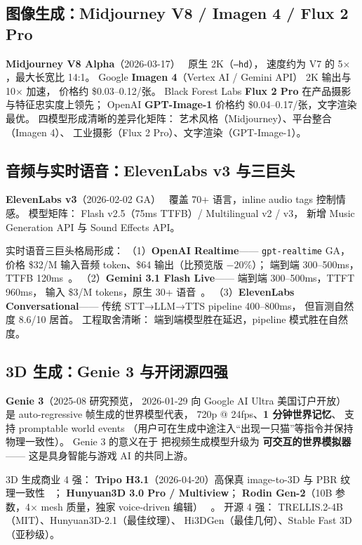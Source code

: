 \subsection{图像生成：Midjourney V8 / Imagen 4 / Flux 2 Pro}

\textbf{Midjourney V8 Alpha}（2026-03-17）~\cite{midjourney_v8_2026}
原生 2K（\texttt{--hd}），
速度约为 V7 的 5$\times$，最大长宽比 14:1。
Google \textbf{Imagen 4}（Vertex AI / Gemini API）
2K 输出与 10$\times$ 加速，
价格约 \$0.03--0.12/张。
Black Forest Labs \textbf{Flux 2 Pro} 在产品摄影与特征忠实度上领先；
OpenAI \textbf{GPT-Image-1} 价格约 \$0.04--0.17/张，文字渲染最优。
四模型形成清晰的差异化矩阵：
艺术风格（Midjourney）、平台整合（Imagen 4）、
工业摄影（Flux 2 Pro）、文字渲染（GPT-Image-1）。

\subsection{音频与实时语音：ElevenLabs v3 与三巨头}

\textbf{ElevenLabs v3}（2026-02-02 GA）~\cite{elevenlabs_v3_2026}
覆盖 70+ 语言，inline audio tags 控制情感。
模型矩阵：
Flash v2.5（75ms TTFB）/ Multilingual v2 / v3，
新增 Music Generation API 与 Sound Effects API。

实时语音三巨头格局形成：
（1）\textbf{OpenAI Realtime}——
\texttt{gpt-realtime} GA，
价格 \$32/M 输入音频 token、\$64 输出（比预览版 $-20\%$）；
端到端 300--500ms，TTFB 120ms~\cite{gpt_realtime_ga_2026}。
（2）\textbf{Gemini 3.1 Flash Live}——
端到端 300--500ms，TTFT 960ms，
输入 \$3/M tokens，原生 30+ 语音~\cite{gemini31_flash_live_2026}。
（3）\textbf{ElevenLabs Conversational}——
传统 STT→LLM→TTS pipeline 400--800ms，
但盲测自然度 8.6/10 居首。
工程取舍清晰：
端到端模型胜在延迟，pipeline 模式胜在自然度。

\subsection{3D 生成：Genie 3 与开闭源四强}

\textbf{Genie 3}（2025-08 研究预览，
2026-01-29 向 Google AI Ultra 美国订户开放）%
~\cite{genie3_2026}
是 auto-regressive 帧生成的世界模型代表，
720p @ 24fps、\textbf{1 分钟世界记忆}、
支持 promptable world events
（用户可在生成中途注入“出现一只猫”等指令并保持物理一致性）。
Genie 3 的意义在于
把视频生成模型升级为
\textbf{可交互的世界模拟器}——
这是具身智能与游戏 AI 的共同上游。

3D 生成商业 4 强：
\textbf{Tripo H3.1}（2026-04-20）高保真 image-to-3D 与 PBR 纹理一致性%
~\cite{tripo_h31_2026}；
\textbf{Hunyuan3D 3.0 Pro / Multiview}；
\textbf{Rodin Gen-2}（10B 参数，4$\times$ mesh 质量，独家 voice-driven 编辑）%
~\cite{rodin_gen2_2026}。
开源 4 强：
TRELLIS.2-4B（MIT）、Hunyuan3D-2.1（最佳纹理）、
Hi3DGen（最佳几何）、Stable Fast 3D（亚秒级）。

